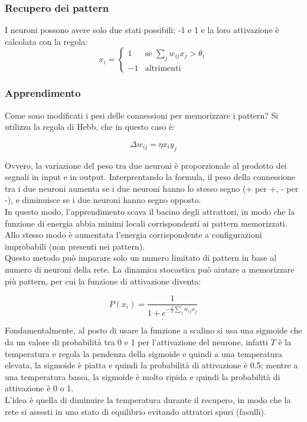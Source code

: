 \subsubsection{Recupero dei pattern}
I neuroni possono avere solo due stati possibili: -1 e 1 e la loro attivazione è
calcolata con la regola:
\begin{equation*}
	x_i = \begin{cases}
		1 & \text{se } \sum_{j} w_{ij} x_j > \theta_i\\
		-1 & \text{altrimenti}
	\end{cases}
\end{equation*}

\subsubsection{Apprendimento}

Come sono modificati i pesi delle connessioni per memorizzare i pattern? Si
utilizza la regola di Hebb, che in questo caso è:

\begin{equation*}
	\Delta w_{ij} = \eta x_i y_j
\end{equation*}

Ovvero, la variazione del peso tra due neuroni è proporzionale al prodotto dei 
segnali in input e in output. Interprentando la formula, il peso della
connessione tra i due neuroni aumenta se i due neuroni hanno lo stesso segno (+
per +, - per -), e diminuisce se i due neuroni hanno segno opposto.\\
In questo modo, l'apprendimento scava il bacino degli attrattori, in modo che
la funzione di energia abbia minimi locali corrispondenti ai pattern memorizzati.
Allo stesso modo è aumentata l'energia corrispondente a configurazioni
improbabili (non presenti nei pattern).\\
Questo metodo può imparare solo un numero limitato di pattern in base al numero
di neuroni della rete. La dinamica stocastica può aiutare a memorizzare più
pattern, per cui la funzione di attivazione diventa:

\begin{equation*}
	P(x_i) = \frac{1}{1 + e^{-\frac{1}{T} \sum_{j} w_{ij} x_j}}
\end{equation*}

Fondamentalmente, al posto di usare la funzione a scalino si usa una sigmoide
che da un valore di probabilità tra 0 e 1 per l'attivazione del neurone, infatti
$T$ è la temperatura e regola la pendenza della sigmoide e quindi a una
temperatura elevata, la sigmoide è piatta e quindi la probabilità di attivazione
è 0.5; mentre a una temperatura bassa, la sigmoide è molto ripida e quindi la
probabilità di attivazione è 0 o 1.\\
L'idea è quella di diminuire la temperatura durante il recupero, in modo che la
rete si assesti in uno stato di equilibrio evitando attratori spuri (fasulli).

